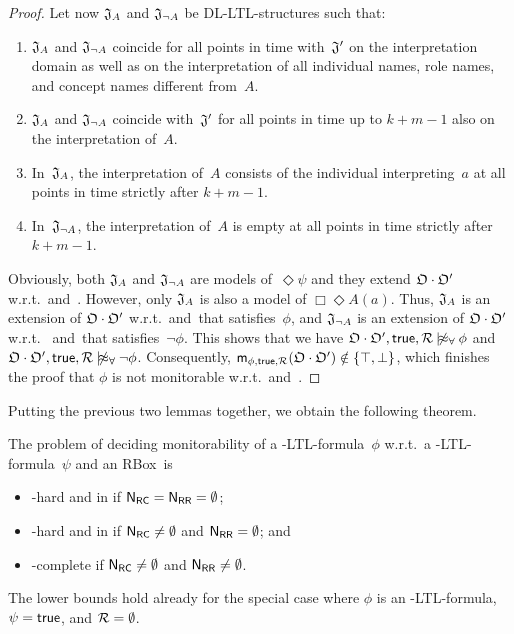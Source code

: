 \begin{proof}
    Let now $\mathfrak{J}_A$ and $\mathfrak{J}_{\lnot A}$ be DL-LTL-structures such that:
    \begin{enumerate}
        \item $\mathfrak{J}_A$ and $\mathfrak{J}_{\lnot A}$ coincide for all points in time
            with~$\mathfrak{J}'$ on the interpretation domain as well as on the
            interpretation of all individual names, role names, and concept
            names different from~$A$.
        \item $\mathfrak{J}_A$ and $\mathfrak{J}_{\lnot A}$ coincide with~$\mathfrak{J}'$ for all points
            in time up to $k+m-1$ also on the interpretation of~$A$.
        \item In~$\mathfrak{J}_A$, the interpretation of~$A$ consists of the individual
            interpreting~$a$ at all points in time strictly after $k+m-1$.
        \item In~$\mathfrak{J}_{\lnot A}$, the interpretation of~$A$ is empty at all
            points in time strictly after $k+m-1$.
    \end{enumerate}
    Obviously, both $\mathfrak{J}_A$ and $\mathfrak{J}_{\lnot A}$ are models of~$\Diamond\psi$
    and they extend $\mathfrak{O}\cdot\mathfrak{O}'$ w.r.t.~\true and~\Rmc.  However, only
    $\mathfrak{J}_A$ is also a model of $\Box\Diamond A(a)$.  Thus, $\mathfrak{J}_A$ is an
    extension of $\mathfrak{O}\cdot\mathfrak{O}'$ w.r.t.~\true and~\Rmc that satisfies~$\phi$,
    and $\mathfrak{J}_{\lnot A}$ is an extension of $\mathfrak{O}\cdot\mathfrak{O}'$ w.r.t.~\true
    and~\Rmc that satisfies~$\lnot\phi$.  This shows that we have
    $\Omf\cdot\Omf',\true,\Rmc\notmodelsal\phi$ and
    $\Omf\cdot\Omf',\true,\Rmc\notmodelsal\lnot\phi$.  Consequently,
    $\mathsf{m}_{\phi,\mathsf{true},\mathcal{R}}(\mathfrak{O}\cdot\mathfrak{O}')\notin\{\top,\bot\}$, which finishes
    the proof that $\phi$ is not monitorable w.r.t.~\true and~\Rmc.
\end{proof}

\noindent
Putting the previous two lemmas together, we obtain the following theorem.

\begin{theorem}
    The problem of deciding monitorability of a \SHOQ-LTL-formula~$\phi$
    w.r.t.~a \SHOQ-LTL-formula~$\psi$ and an RBox~\Rmc is
    \begin{itemize}
        \item \ExpTime-hard and in \TwoExpTime if $\mathsf{N_{RC}}=\mathsf{N_{RR}}=\emptyset$;
        \item \coNExpTime-hard and in \TwoExpTime if $\mathsf{N_{RC}}\ne\emptyset$ and
            $\mathsf{N_{RR}}=\emptyset$; and
        \item \TwoExpTime-complete if $\mathsf{N_{RC}}\ne\emptyset$ and $\mathsf{N_{RR}}\ne\emptyset$.
    \end{itemize}
    The lower bounds hold already for the special case where $\phi$ is an
    \ALC-LTL-formula, $\psi=\mathsf{true}$, and $\mathcal{R}=\emptyset$.
\end{theorem}

